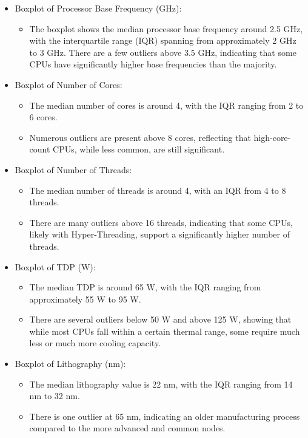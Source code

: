\begin{itemize}
    \item Boxplot of Processor Base Frequency (GHz):
    \begin{itemize}
        \item The boxplot shows the median processor base frequency around 2.5 GHz, with the interquartile range (IQR) spanning from approximately 2 GHz to 3 GHz.
        There are a few outliers above 3.5 GHz, indicating that some CPUs have significantly higher base frequencies than the majority.
    \end{itemize}

    \item Boxplot of Number of Cores:
    \begin{itemize}
        \item The median number of cores is around 4, with the IQR ranging from 2 to 6 cores.
        \item Numerous outliers are present above 8 cores, reflecting that high-core-count CPUs, while less common, are still significant.
    \end{itemize}

    \item Boxplot of Number of Threads:
    \begin{itemize}
        \item The median number of threads is around 4, with an IQR from 4 to 8 threads.
        \item There are many outliers above 16 threads, indicating that some CPUs, likely with Hyper-Threading, support a significantly higher number of threads.
    \end{itemize}
    
    \item Boxplot of TDP (W):
    \begin{itemize}
        \item The median TDP is around 65 W, with the IQR ranging from approximately 55 W to 95 W.
        \item There are several outliers below 50 W and above 125 W, showing that while most CPUs fall within a certain thermal range, some require much less or much more cooling capacity.
    \end{itemize}

    \item Boxplot of Lithography (nm):
    \begin{itemize}
        \item The median lithography value is 22 nm, with the IQR ranging from 14 nm to 32 nm.
        \item There is one outlier at 65 nm, indicating an older manufacturing process compared to the more advanced and common nodes.
    \end{itemize}
\end{itemize}

